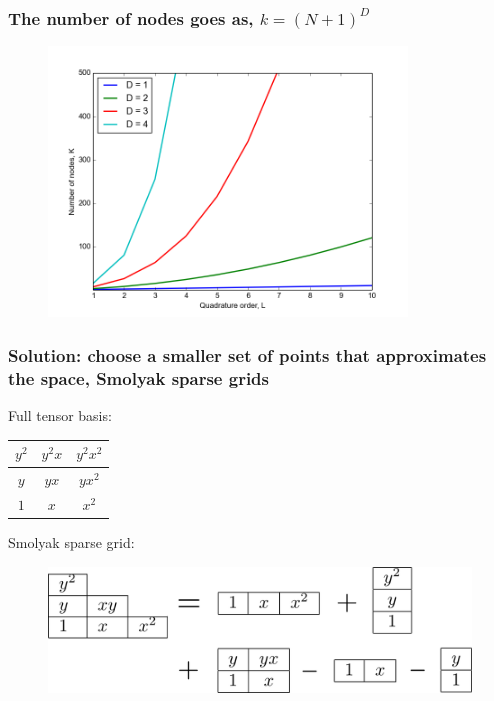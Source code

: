 \documentclass{beamer}
\begin{document}
\begin{frame}
 \frametitle{The number of nodes goes as, $k = (N+1)^D$}
 \begin{figure}
  \includegraphics[width=0.85\textwidth]{dimensionality_nodes.png}
 \end{figure}
\end{frame}

\begin{frame}
 \frametitle{Solution: choose a smaller set of points that approximates the space, Smolyak sparse grids}

Full tensor basis:
\begin{table}
 \begin{tabular}{|c|c|c|}\hline
 $y^2$&$y^2x$&$y^2x^2$\\\hline
 $y$&$yx$&$yx^2$\\\hline
 $1$&$x$&$x^2$\\\hline
 \end{tabular}
\end{table}
\pause
Smolyak sparse grid:
 \begin{figure}
  \includegraphics[width=\textwidth]{smolyak2.png}
 \end{figure}

\end{frame}
\end{document}

